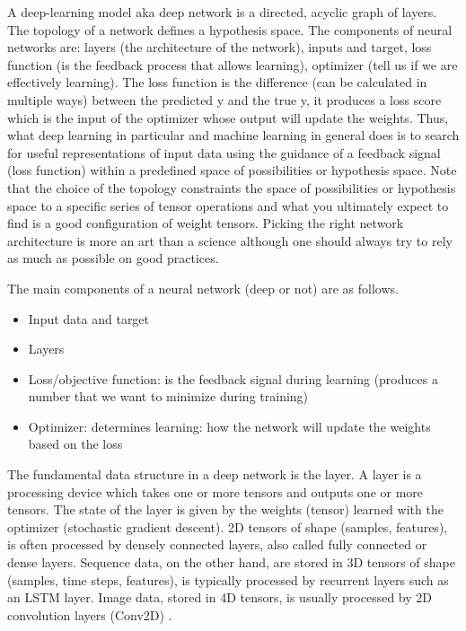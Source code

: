 \documentclass[11pt]{article}
\theoremstyle{definition}
\theoremstyle{remark}
\begin{document}
A deep-learning model aka  deep network is a directed, acyclic graph of layers. The topology of a network defines a hypothesis space.
The components of neural networks are: layers (the architecture of the network), inputs and target, loss function (is the feedback process that allows learning), optimizer (tell us if we are effectively learning). The loss function is the difference (can be calculated in multiple ways) between the predicted y and the true y, it produces a loss score which is the input of the optimizer whose output will update the weights. 
Thus, what deep learning in particular and machine learning in general does is to search for useful representations of input data using the guidance of a feedback signal (loss function) within a predefined space of possibilities or hypothesis space. Note that the choice of the topology constraints the space of possibilities or hypothesis space to a specific series of tensor operations and what you ultimately expect to find is a good configuration of weight tensors. Picking the right network architecture is more an art than a science although one should always try to rely as much as possible on good practices.

The main components of a neural network (deep or not) are as follows.
\begin{itemize}
	\item Input data and target
	\item Layers
	\item Loss/objective function: is the feedback signal during learning (produces a number that we want to minimize during training) 
	\item Optimizer: determines learning: how the network will update the weights based on the loss
\end{itemize}
The fundamental data structure in a deep network is the layer. A layer is a processing device which takes one or more tensors and outputs one or more tensors. The state of the layer is given by the weights (tensor) learned with the optimizer (stochastic gradient descent).
2D tensors of shape (samples, features), is often processed by densely connected layers, also called fully connected or dense layers. Sequence data, on the other hand, are stored in 3D tensors of shape (samples, time steps, features), is typically processed by recurrent layers such as an LSTM layer. Image data, stored in 4D tensors, is usually processed by 2D convolution layers (Conv2D) \cite{chollet2017deep}.
\end{document}
